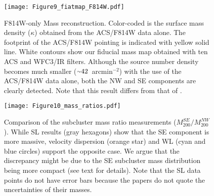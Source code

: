 \documentclass[twocolumn]{aastex631}
\newcommand{\mytilde}{\raise.19ex\hbox{$\scriptstyle\sim$}}
\newcommand{\persqarcmin}{arcmin$^{-2}$}
\begin{document}
\begin{figure}
\centering
\texttt{[image: Figure9\_fiatmap\_F814W.pdf]}
\caption{F814W-only Mass reconstruction. 
Color-coded is the surface mass density ($\kappa$) obtained from the ACS/F814W data alone. 
The footprint of the ACS/F814W pointing is indicated with yellow solid line. 
White contours show our fiducial mass map obtained with ten ACS and WFC3/IR filters. 
Although the source number density becomes much smaller ($\mytilde42$~\persqarcmin) with the use of the ACS/F814W data alone, both the NW and SE components are clearly detected. 
Note that this result differs from that of \cite{Harvey2015}.}
\label{fig:mass_map_F814W}
\end{figure}




\begin{figure}
\centering
\texttt{[image: Figure10\_mass\_ratios.pdf]}
\caption{Comparison of the subcluster mass ratio measurements ($M_{200}^{SE}/M_{200}^{NW}$).
While SL results (gray hexagons) show that the SE component is more massive, velocity dispersion (orange star) and WL (cyan and blue circles) support the opposite case. 
We argue that the discrepancy might be due to the SE subcluster mass distribution being more compact (see text for details). 
Note that the SL data points do not have error bars because the papers do not quote the uncertainties of their masses.}
\label{fig:mass_ratio_compare}
\end{figure}
\end{document}
